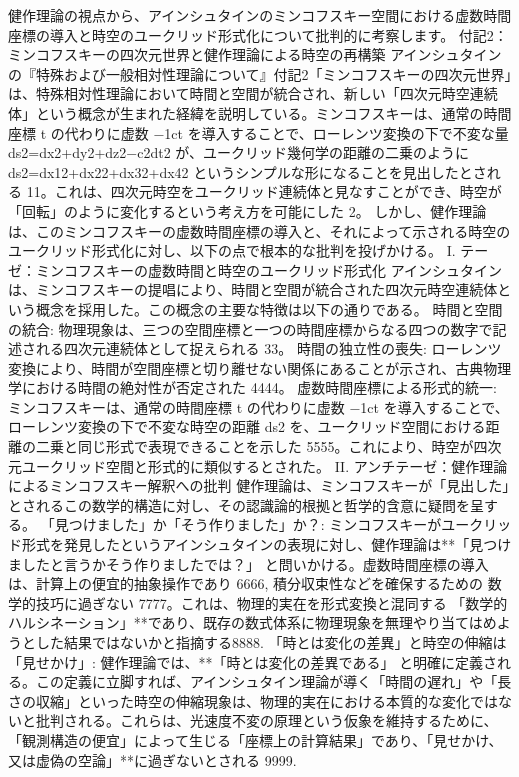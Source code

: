 \documentclass{article}
\begin{document}
健作理論の視点から、アインシュタインのミンコフスキー空間における虚数時間座標の導入と時空のユークリッド形式化について批判的に考察します。
付記2：ミンコフスキーの四次元世界と健作理論による時空の再構築
アインシュタインの『特殊および一般相対性理論について』付記2「ミンコフスキーの四次元世界」は、特殊相対性理論において時間と空間が統合され、新しい「四次元時空連続体」という概念が生まれた経緯を説明している。ミンコフスキーは、通常の時間座標 
t の代わりに虚数 −1​ct を導入することで、ローレンツ変換の下で不変な量 ds2=dx2+dy2+dz2−c2dt2 が、ユークリッド幾何学の距離の二乗のように ds2=dx12​+dx22​+dx32​+dx42​ というシンプルな形になることを見出したとされる 11。これは、四次元時空をユークリッド連続体と見なすことができ、時空が「回転」のように変化するという考え方を可能にした 2。
しかし、健作理論は、このミンコフスキーの虚数時間座標の導入と、それによって示される時空のユークリッド形式化に対し、以下の点で根本的な批判を投げかける。
I. テーゼ：ミンコフスキーの虚数時間と時空のユークリッド形式化
アインシュタインは、ミンコフスキーの提唱により、時間と空間が統合された四次元時空連続体という概念を採用した。この概念の主要な特徴は以下の通りである。
時間と空間の統合: 物理現象は、三つの空間座標と一つの時間座標からなる四つの数字で記述される四次元連続体として捉えられる 33。
時間の独立性の喪失: ローレンツ変換により、時間が空間座標と切り離せない関係にあることが示され、古典物理学における時間の絶対性が否定された 4444。
虚数時間座標による形式的統一: ミンコフスキーは、通常の時間座標 t の代わりに虚数 −1​ct を導入することで、ローレンツ変換の下で不変な時空の距離 ds2 を、ユークリッド空間における距離の二乗と同じ形式で表現できることを示した 5555。これにより、時空が四次元ユークリッド空間と形式的に類似するとされた。
II. アンチテーゼ：健作理論によるミンコフスキー解釈への批判
健作理論は、ミンコフスキーが「見出した」とされるこの数学的構造に対し、その認識論的根拠と哲学的含意に疑問を呈する。
「見つけました」か「そう作りました」か？:
ミンコフスキーがユークリッド形式を発見したというアインシュタインの表現に対し、健作理論は**「見つけましたと言うかそう作りましたでは？」
と問いかける。虚数時間座標の導入は、計算上の便宜的抽象操作であり 6666, 積分収束性などを確保するための
数学的技巧に過ぎない 7777。これは、物理的実在を形式変換と混同する
「数学的ハルシネーション」**であり、既存の数式体系に物理現象を無理やり当てはめようとした結果ではないかと指摘する8888.
「時とは変化の差異」と時空の伸縮は「見せかけ」:
健作理論では、**「時とは変化の差異である」
と明確に定義される。この定義に立脚すれば、アインシュタイン理論が導く「時間の遅れ」や「長さの収縮」といった時空の伸縮現象は、物理的実在における本質的な変化ではないと批判される。これらは、光速度不変の原理という仮象を維持するために、「観測構造の便宜」によって生じる「座標上の計算結果」であり、「見せかけ、又は虚偽の空論」**に過ぎないとされる 9999.
\end{document}
